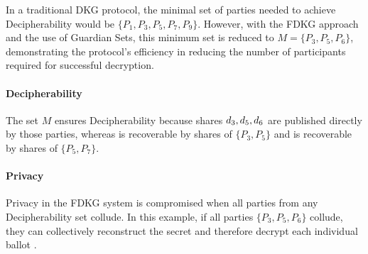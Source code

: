 \documentclass[runningheads]{llncs}
\begin{document}
In a traditional DKG protocol, the minimal set of parties needed to achieve Decipherability would be \(\{P_1, P_3, P_5, P_7, P_9 \}\). However, with the FDKG approach and the use of Guardian Sets, this minimum set is reduced to \(M = \{P_3, P_5, P_6\}\), demonstrating the protocol's efficiency in reducing the number of participants required for successful decryption.

\paragraph{Decipherability}
The set $M$ ensures Decipherability because shares $d_{3},d_{5},d_{6}$ are published directly by those parties, whereas  is recoverable by shares of \(\{P_3, P_5\}\) and  is recoverable by shares of \(\{P_5, P_7\}\).

\paragraph{Privacy}
Privacy in the FDKG system is compromised when all parties from any Decipherability set collude. In this example, if all parties \(\{P_3, P_5, P_6\}\) collude, they can collectively reconstruct the secret \DecryptionKey{} and therefore decrypt each individual ballot .
\end{document}
